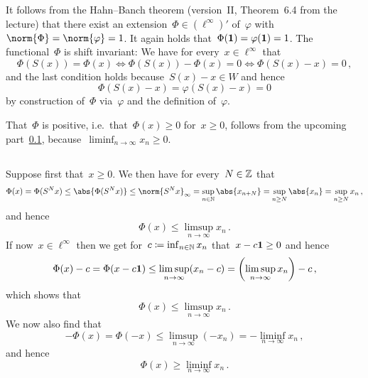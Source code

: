 It follows from the Hahn--Banch theorem (version~II, Theorem~6.4 from the lecture) that there exist an extension~$\Phi \in (\ell^\infty)'$ of~$\varphi$ with~$\norm{\Phi} = \norm{\varphi} = 1$.
It again holds that~$\Phi(\mathbf{1}) = \varphi(\mathbf{1}) = 1$.
The functional~$\Phi$ is shift invariant:
We have for every~$x \in \ell^\infty$ that
\[
        \Phi(S(x)) = \Phi(x)
  \iff  \Phi(S(x)) - \Phi(x) = 0
  \iff  \Phi(S(x) - x) = 0 \,,
\]
and the last condition holds because~$S(x) - x \in W$ and hence
\[
    \Phi(S(x) - x)
  = \varphi(S(x) - x)
  = 0
\]
by construction of~$\Phi$ via~$\varphi$ and the definition of~$\varphi$.

That~$\Phi$ is positive, i.e.\ that~$\Phi(x) \geq 0$ for~$x \geq 0$, follows from the upcoming part~\ref{estimate on behavior}, because~$\liminf_{n \to \infty} x_n \geq 0$.





\subsection{}
\label{estimate on behavior}


Suppose first that~$x \geq 0$.
We then have for every~$N \in \mathbb{Z}$ that
\[
        \Phi(x)
  =     \Phi(S^N x)
  \leq  \abs{ \Phi(S^N x) }
  \leq  \norm{ S^N x }_{\infty}
  =     \sup_{n \in \Natural} \abs{x_{n+N}}
  =     \sup_{n \geq N} \abs{x_n}
  =     \sup_{n \geq N} x_n \,,
\]
and hence
\[
        \Phi(x)
  \leq  \limsup_{n \to \infty} x_n \,.
\]
If now~$x \in \ell^\infty$ then we get for~$c \coloneqq \inf_{n \in \mathbb{N}} x_n$ that~$x - c \mathbf{1} \geq 0$ and hence
\[
        \Phi(x) - c
  =     \Phi(x - c \mathbf{1})
  \leq  \limsup_{n \to \infty} (x_n - c)
  =     \left( \limsup_{n \to \infty} x_n \right) - c \,,
\]
which shows that
\[
        \Phi(x)
  \leq  \limsup_{n \to \infty} x_n \,.
\]
We now also find that
\[
        -\Phi(x)
  =     \Phi(-x)
  \leq  \limsup_{n \to \infty} (-x_n)
  =     - \liminf_{n \to \infty} x_n \,,
\]
and hence
\[
        \Phi(x)
  \geq  \liminf_{n \to \infty} x_n \,.
\]










